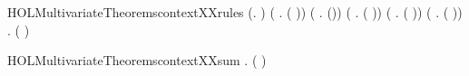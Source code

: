 \newcommand{\HOLMultivariateTheoremscontextXXrestrXXrule}{\UseVerbatim{HOLMultivariateTheoremscontextXXrestrXXrule}}
\begin{SaveVerbatim}{HOLMultivariateTheoremscontextXXrules}
\HOLTokenTurnstile{} (\HOLSymConst{\HOLTokenForall{}}.   ) \HOLSymConst{\HOLTokenConj{}} (\HOLSymConst{\HOLTokenForall{}} .   ( )) \HOLSymConst{\HOLTokenConj{}}
   (\HOLSymConst{\HOLTokenForall{}}  .    \HOLSymConst{\HOLTokenImp{}}   ()) \HOLSymConst{\HOLTokenConj{}}
   (\HOLSymConst{\HOLTokenForall{}}  .
           \HOLSymConst{\HOLTokenConj{}}    \HOLSymConst{\HOLTokenImp{}}   ( \HOLSymConst{\ensuremath{+}} )) \HOLSymConst{\HOLTokenConj{}}
   (\HOLSymConst{\HOLTokenForall{}}  .
           \HOLSymConst{\HOLTokenConj{}}    \HOLSymConst{\HOLTokenImp{}}   ( \HOLSymConst{\ensuremath{\parallel}} )) \HOLSymConst{\HOLTokenConj{}}
   (\HOLSymConst{\HOLTokenForall{}}  .    \HOLSymConst{\HOLTokenImp{}}   (\HOLConst{\ensuremath{\nu}}  )) \HOLSymConst{\HOLTokenConj{}}
   \HOLSymConst{\HOLTokenForall{}}  .    \HOLSymConst{\HOLTokenImp{}}   (  )
\end{SaveVerbatim}
\newcommand{\HOLMultivariateTheoremscontextXXrules}{\UseVerbatim{HOLMultivariateTheoremscontextXXrules}}
\begin{SaveVerbatim}{HOLMultivariateTheoremscontextXXsum}
\HOLTokenTurnstile{} \HOLSymConst{\HOLTokenForall{}}  .
         ( \HOLSymConst{\ensuremath{+}} ) \HOLSymConst{\HOLTokenImp{}}    \HOLSymConst{\HOLTokenConj{}}   
\end{SaveVerbatim}
